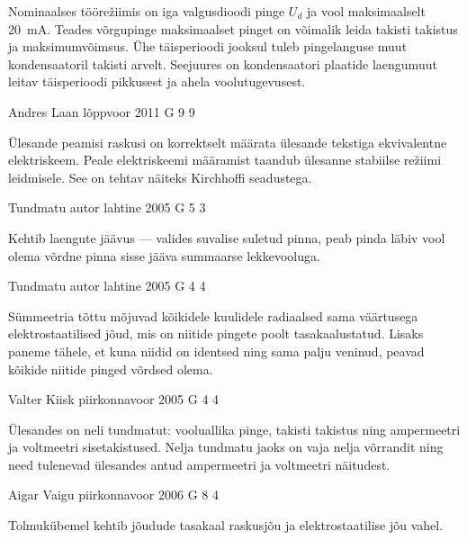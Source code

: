 \documentclass[11pt]{article}
\begin{document}
{{\ifHint
Nominaalses töörežiimis on iga valgusdioodi pinge $U_d$ ja vool maksimaalselt \SI{20}{mA}. Teades võrgupinge maksimaalset pinget on võimalik leida takisti takistus ja maksimumvõimsus. Ühe täisperioodi jooksul tuleb pingelanguse muut kondensaatoril takisti arvelt. Seejuures on kondensaatori plaatide laengumuut leitav täisperioodi pikkusest ja ahela voolutugevusest.
\fi
}

{Andres Laan} %
{lõppvoor} %
{2011} %
{G 9} %
{9} %
{

\ifHint
Ülesande peamisi raskusi on korrektselt määrata ülesande tekstiga ekvivalentne elektriskeem. Peale elektriskeemi määramist taandub ülesanne stabiilse režiimi leidmisele. See on tehtav näiteks Kirchhoffi seadustega.
\fi
}

{Tundmatu autor} %
{lahtine} %
{2005} %
{G 5} %
{3} %
{

\ifHint
Kehtib laengute jäävus --- valides suvalise suletud pinna, peab pinda läbiv vool olema võrdne pinna sisse jääva summaarse lekkevooluga.
\fi
}

{Tundmatu autor} %
{lahtine} %
{2005} %
{G 4} %
{4} %
{

\ifHint
Sümmeetria tõttu mõjuvad kõikidele kuulidele radiaalsed sama väärtusega elektrostaatilised jõud, mis on niitide pingete poolt tasakaalustatud. Lisaks paneme tähele, et kuna niidid on identsed ning sama palju veninud, peavad kõikide niitide pinged võrdsed olema.
\fi
}

{Valter Kiisk} %
{piirkonnavoor} %
{2005} %
{G 4} %
{4} %
{

\ifHint
Ülesandes on neli tundmatut: vooluallika pinge, takisti takistus ning ampermeetri ja voltmeetri sisetakistused. Nelja tundmatu jaoks on vaja nelja võrrandit ning need tulenevad ülesandes antud ampermeetri ja voltmeetri näitudest.
\fi
}

{Aigar Vaigu} %
{piirkonnavoor} %
{2006} %
{G 8} %
{4} %
{

\ifHint
Tolmukübemel kehtib jõudude tasakaal raskusjõu ja elektrostaatilise jõu vahel.
\fi
}

}
\end{document}
